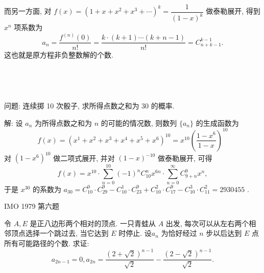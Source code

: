 而另一方面, 对 $ f(x) = (1+x+x^2+x^3+\cdots)^k = \dfrac{1}{(1-x)^k}$ 做泰勒展开, 得到 $x^n$ 项系数为
\[
a_n = \frac{f^{(n)}(0)}{n!} = \frac{k\cdot(k+1)\cdots(k+n-1)}{n!} = C^{k-1}_{n+k-1}.
\]
这也就是原方程非负整数解的个数.

~

~

\noindent 问题: 连续掷 10 次骰子, 求所得点数之和为 30 的概率.

解: 设 $a_n$ 为所得点数之和为 $n$ 的可能的情况数, 则数列 $\{a_n\}$ 的生成函数为
\[
f(x) = (x^1+x^2+x^3+x^4+x^5+x^6)^{10} = x^{10}\left(\frac{1-x^6}{1-x}\right)^{10}
\]
对 $(1-x^6)^{10}$ 做二项式展开, 并对 $(1-x)^{-10}$ 做泰勒展开, 可得
\[
f(x) = x^{10}\cdot\sum_{n=0}^{10}{(-1)^nC_{10}^nx^{6n}} \cdot \sum_{n=0}^{\infty}{C_{9+n}^9x^n},
\]
于是 $x^{30}$ 的系数为 $a_{30} = C_{10}^0\cdot C_{29}^9 - C_{10}^1\cdot C_{23}^9 + C_{10}^2\cdot C_{17}^9 - C_{10}^3\cdot C_{11}^2 = 2930455$ .


\newpage
\noindent IMO 1979 第六题

令 $A,E$ 是正八边形两个相对的顶点. 一只青蛙从 $A$ 出发, 每次可以从左右两个相邻顶点选择一个跳过去, 当它达到 $E$ 时停止. $设 a_n$ 为恰好经过 $n$ 步以后达到 $E$ 点所有可能路径的个数. 求证:
\[a_{2n-1} = 0, a_{2n} = \frac{(2+\sqrt{2})^{n-1}}{\sqrt{2}} - \frac{(2-\sqrt{2})^{n-1}}{\sqrt{2}} .\]
\begin{figure*}[htbp]
\centering
{}
\end{figure*}

